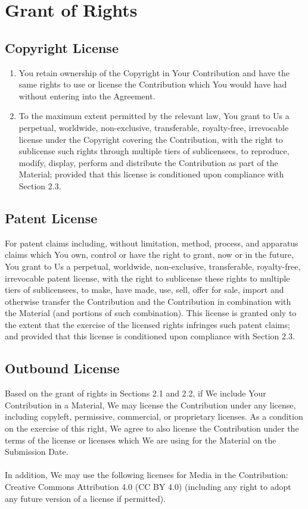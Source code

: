 \documentclass{article}
\begin{document}
\section{Grant of Rights}

\subsection{Copyright License}

\begin{enumerate}
\item You retain ownership of the Copyright in Your Contribution and have the
same rights to use or license the Contribution which You would have had without
entering into the Agreement.
\item To the maximum extent permitted by the relevant law, You grant to Us a
perpetual, worldwide, non-exclusive, transferable, royalty-free, irrevocable
license under the Copyright covering the Contribution, with the right to
sublicense such rights through multiple tiers of sublicensees, to reproduce,
modify, display, perform and distribute the Contribution as part of the
Material; provided that this license is conditioned upon compliance with
Section 2.3.
\end{enumerate}

\subsection{Patent License}
For patent claims including, without limitation, method, process, and apparatus
claims which You own, control or have the right to grant, now or in the future,
You grant to Us a perpetual, worldwide, non-exclusive, transferable,
royalty-free, irrevocable patent license, with the right to sublicense these
rights to multiple tiers of sublicensees, to make, have made, use, sell, offer
for sale, import and otherwise transfer the Contribution and the Contribution in
combination with the Material (and portions of such combination). This license
is granted only to the extent that the exercise of the licensed rights infringes
such patent claims; and provided that this license is conditioned upon
compliance with Section 2.3.

\subsection{Outbound License}
Based on the grant of rights in Sections 2.1 and 2.2, if We include Your
Contribution in a Material, We may license the Contribution under any license,
including copyleft, permissive, commercial, or proprietary licenses. As a
condition on the exercise of this right, We agree to also license the
Contribution under the terms of the license or licenses which We are using for
the Material on the Submission Date.
\\
\\
In addition, We may use the following licenses for Media in the Contribution:
Creative Commons Attribution 4.0 (CC BY 4.0) (including any right to adopt any
future version of a license if permitted).
\end{document}
